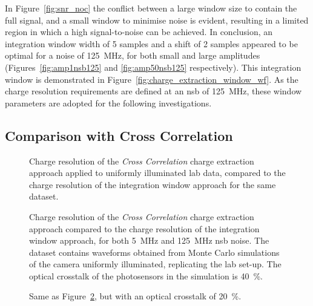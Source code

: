 In Figure~\ref{fig:snr_noc} the conflict between a large window size to contain the full signal, and a small window to minimise noise is evident, resulting in a limited region in which a high signal-to-noise can be achieved. In conclusion, an integration window width of 5 samples and a shift of 2 samples appeared to be optimal for a noise of \SI{125}{MHz}, for both small and large amplitudes (Figures~\ref{fig:amp1nsb125} and \ref{fig:amp50nsb125} respectively). This integration window is demonstrated in Figure~\ref{fig:charge_extraction_window_wf}. As the charge resolution requirements are defined at an \gls{nsb} of \SI{125}{MHz}, these window parameters are adopted for the following investigations.

\subsection{Comparison with Cross Correlation}

\begin{figure}
  \caption[Charge resolution comparison between Cross Correlation and Window Integration for lab data.]{Charge resolution of the \textit{Cross Correlation} charge extraction approach applied to uniformly illuminated lab data, compared to the charge resolution of the integration window approach for the same dataset.}
  \label{fig:cr_ce_lab}
\end{figure}

\begin{figure}
  \caption[Charge resolution comparison between Cross Correlation and Window Integration for MC-lab data with an optical crosstalk of \SI{40}{\percent}.]{Charge resolution of the \textit{Cross Correlation} charge extraction approach compared to the charge resolution of the integration window approach, for both \SI{5}{MHz} and \SI{125}{MHz} \gls{nsb} noise. The dataset contains waveforms obtained from Monte Carlo simulations of the camera uniformly illuminated, replicating the lab set-up. The optical crosstalk of the photosensors in the simulation is \SI{40}{\percent}.}
  \label{fig:cr_ce_mclab_opct40}
\end{figure}

\begin{figure}
  \caption[Charge resolution comparison between Cross Correlation and Window Integration for MC-lab data with an optical crosstalk of \SI{20}{\percent}.]{Same as Figure~\ref{fig:cr_ce_mclab_opct40}, but with an optical crosstalk of \SI{20}{\percent}.}
  \label{fig:cr_ce_mclab_opct20}
\end{figure}

